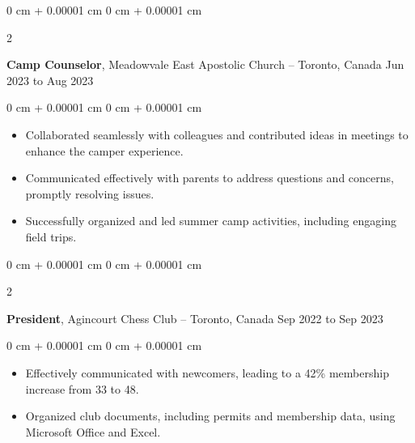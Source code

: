 \documentclass[10pt, letterpaper]{article}
\newenvironment{highlights}{
    \begin{itemize}[
        topsep=0.10 cm,
        parsep=0.10 cm,
        partopsep=0pt,
        itemsep=0pt,
        leftmargin=0 cm + 10pt
    ]
}{
    \end{itemize}
} %
\newenvironment{onecolentry}{
    \begin{adjustwidth}{
        0 cm + 0.00001 cm
    }{
        0 cm + 0.00001 cm
    }
}{
    \end{adjustwidth}
} %
\newenvironment{twocolentry}[2][]{
    \onecolentry
    \def\secondColumn{#2}
    \setcolumnwidth{\fill, 4.5 cm}
    \begin{paracol}{2}
}{
    \switchcolumn \raggedleft \secondColumn
    \end{paracol}
    \endonecolentry
} %
\begin{document}
        \vspace{0.2 cm}

        \begin{twocolentry}{
            Jun 2023 to Aug 2023
        }
            \textbf{Camp Counselor}, Meadowvale East Apostolic Church -- Toronto, Canada\end{twocolentry}

        \vspace{0.10 cm}
        \begin{onecolentry}
            \begin{highlights}
                \item Collaborated seamlessly with colleagues and contributed ideas in meetings to enhance the camper experience.
                \item Communicated effectively with parents to address questions and concerns, promptly resolving issues.
                \item Successfully organized and led summer camp activities, including engaging field trips.
            \end{highlights}
        \end{onecolentry}


        \vspace{0.2 cm}

        \begin{twocolentry}{
            Sep 2022 to Sep 2023
        }
            \textbf{President}, Agincourt Chess Club -- Toronto, Canada\end{twocolentry}

        \vspace{0.10 cm}
        \begin{onecolentry}
            \begin{highlights}
                \item Effectively communicated with newcomers, leading to a 42\% membership increase from 33 to 48.
                \item Organized club documents, including permits and membership data, using Microsoft Office and Excel.
            \end{highlights}
        \end{onecolentry}



    
\end{document}

